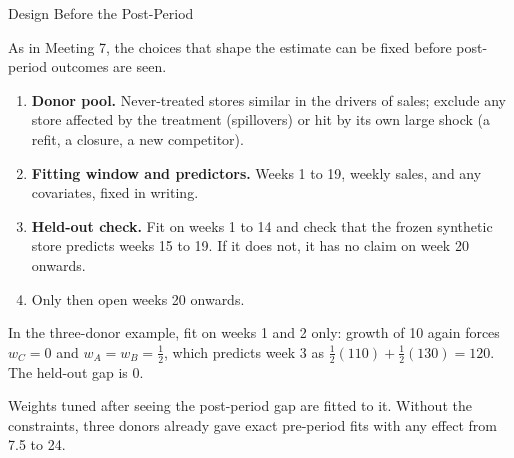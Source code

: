 \documentclass[aspectratio=169, 11pt, handout]{beamer}
\begin{document}
\begin{frame}{Design Before the Post-Period}

As in Meeting 7, the choices that shape the estimate can be fixed before post-period outcomes are seen.

\begin{enumerate}
  \item \textbf{Donor pool.} Never-treated stores similar in the drivers of sales; exclude any store affected by the treatment (spillovers) or hit by its own large shock (a refit, a closure, a new competitor).
  \item \textbf{Fitting window and predictors.} Weeks 1 to 19, weekly sales, and any covariates, fixed in writing.
  \item \textbf{Held-out check.} Fit on weeks 1 to 14 and check that the frozen synthetic store predicts weeks 15 to 19. If it does not, it has no claim on week 20 onwards.
  \item Only then open weeks 20 onwards.
\end{enumerate}

\medskip

In the three-donor example, fit on weeks 1 and 2 only: growth of 10 again forces $w_C = 0$ and $w_A = w_B = \tfrac12$, which predicts week 3 as $\tfrac12(110) + \tfrac12(130) = 120$. The held-out gap is 0.

\medskip

Weights tuned after seeing the post-period gap are fitted to it. Without the constraints, three donors already gave exact pre-period fits with any effect from 7.5 to 24.
\end{frame}
\end{document}
